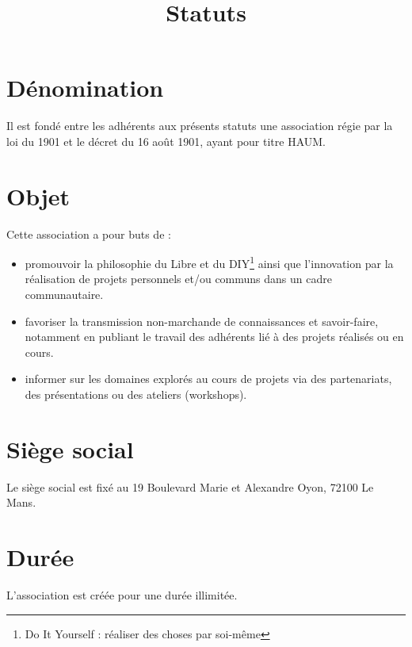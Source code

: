 \documentclass[a4paper, 11pt]{article}
\title{Statuts}
\author{}
\date{}
\newcommand{\nomHS}{HAUM}
\begin{document}
    \maketitle

\section{Dénomination} %

Il est fondé entre les adhérents aux présents statuts une association régie par la loi du 1901 et le décret du 16 août
1901, ayant pour titre \og{}\nomHS\fg{}.


\section{Objet} %

Cette association a pour buts de :

\begin{itemize}
    \item promouvoir la philosophie du Libre et du DIY\footnote{Do It Yourself : réaliser des choses par
        soi-même} ainsi que l'innovation par la réalisation de projets personnels et/ou communs dans un cadre
        communautaire.
    \item favoriser la transmission non-marchande de connaissances et savoir-faire, notamment en publiant le travail des
        adhérents lié à des projets réalisés ou en cours.
    \item informer sur les domaines explorés au cours de projets via des partenariats, des présentations ou des ateliers
        (workshops).
\end{itemize}


\section{Siège social} %

Le siège social est fixé au 19 Boulevard Marie et Alexandre Oyon, 72100 Le Mans.


\section{Durée} %

L'association est créée pour une durée illimitée.

\end{document}
